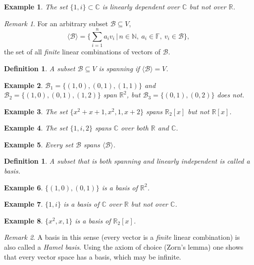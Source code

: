 \documentclass[12pt]{article}
\newcommand{\double}{\hspace{2pt}}
\theoremstyle{breakplain}
\theoremstyle{breakdef}
\newtheorem{definition}[theorem]{Definition}
\newtheorem*{example}{Example}
\theoremstyle{remark}
\newtheorem*{remark}{Remark}
\begin{document}
\begin{example}
    The set $\{ 1,i\}\subset\mathbb{C}$ is linearly dependent over $\mathbb{C}$ but not over $\mathbb{R}$.
\end{example}
\begin{remark}
    For an arbitrary subset $\mathcal{B}\subseteq V$,
    \[\langle \mathcal{B}\rangle=\Big\{ \sum_{i=1}^n a_iv_i \double \Big| \double n\in\mathbb{N},\ a_i\in \mathbb{F},\ v_i\in \mathcal{B}\Big\},\]
    the set of all \emph{finite} linear combinations of vectors of $\mathcal{B}$.
\end{remark}
\begin{definition}
    A subset $\mathcal{B}\subseteq V$ is \emph{spanning} if $\langle \mathcal{B}\rangle=V$.
\end{definition}
\begin{example}
    $\mathcal{B}_1=\{ (1,0), (0,1),(1,1)\}$ and $\mathcal{B}_2=\{ (1,0), (0,1),(1,2)\}$ span $\mathbb{R}^2$, but $\mathcal{B}_3=\{ (0,1),(0,2)\}$ does not.
\end{example}
\begin{example}
    The set $\{ x^2+x+1, x^2,1,x+2\}$ spans $\mathbb{R}_2[x]$ but not $\mathbb{R}[x]$.
\end{example}
\begin{example}
    The set $\{ 1,i,2\}$ spans $\mathbb{C}$ over both $\mathbb{R}$ and $\mathbb{C}$.
\end{example}
\begin{example}
    Every set $\mathcal{B}$ spans $\langle \mathcal{B}\rangle$.
\end{example}
\begin{definition}
    A subset that is both spanning and linearly independent is called a \emph{basis}.
\end{definition}
\begin{example}
    $\{(1,0),(0,1)\}$ is a basis of $\mathbb{R}^2$.
\end{example}
\begin{example}
    $\{ 1,i\}$ is a basis of $\mathbb{C}$ over $\mathbb{R}$ but not over $\mathbb{C}$.
\end{example}
\begin{example}
    $\{ x^2,x,1\}$ is a basis of $\mathbb{R}_2[x]$.
\end{example}
\begin{remark}
    A basis in this sense (every vector is a \emph{finite} linear combination) is also called a \emph{Hamel basis}. Using the axiom of choice (Zorn's lemma) one shows that every vector space has a basis, which may be infinite.
\end{remark}
\end{document}
